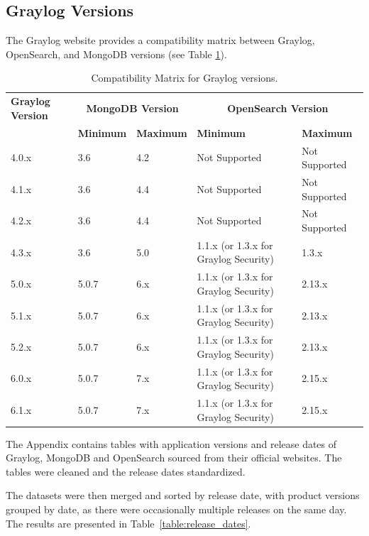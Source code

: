 \documentclass[../main.tex]{subfiles}
\begin{document}
\subsection{Graylog Versions}

The Graylog website provides a compatibility matrix between Graylog, OpenSearch, and MongoDB versions (see Table \ref{table:graylog_compatibility_matrix}). 

\begin{table}[h]
\centering
\begin{tabular}{|l|l|l|l|l|}
\hline
\textbf{Graylog Version} & \multicolumn{2}{c|}{\textbf{MongoDB Version}} & \multicolumn{2}{c|}{\textbf{OpenSearch Version}} \\ \cline{2-5}
 & \textbf{Minimum} & \textbf{Maximum} & \textbf{Minimum} & \textbf{Maximum} \\ \hline
4.0.x & 3.6 & 4.2 & Not Supported & Not Supported \\ \hline
4.1.x & 3.6 & 4.4 & Not Supported & Not Supported \\ \hline
4.2.x & 3.6 & 4.4 & Not Supported & Not Supported \\ \hline
4.3.x & 3.6 & 5.0 & 1.1.x (or 1.3.x for Graylog Security) & 1.3.x \\ \hline
5.0.x & 5.0.7 & 6.x & 1.1.x (or 1.3.x for Graylog Security) & 2.13.x \\ \hline
5.1.x & 5.0.7 & 6.x & 1.1.x (or 1.3.x for Graylog Security) & 2.13.x \\ \hline
5.2.x & 5.0.7 & 6.x & 1.1.x (or 1.3.x for Graylog Security) & 2.13.x \\ \hline
6.0.x & 5.0.7 & 7.x & 1.1.x (or 1.3.x for Graylog Security) & 2.15.x \\ \hline
6.1.x & 5.0.7 & 7.x & 1.1.x (or 1.3.x for Graylog Security) & 2.15.x \\ \hline
\end{tabular}
\caption{Compatibility Matrix for Graylog versions. \protect\footnotemark}
\label{table:graylog_compatibility_matrix}
\end{table}


The Appendix contains tables with application versions and release dates of Graylog, MongoDB and OpenSearch sourced from their official websites. The tables were cleaned and the release dates standardized.

The datasets were then merged and sorted by release date, with product versions grouped by date, as there were occasionally multiple releases on the same day. The results are presented in Table~\ref{table:release_dates}.
\end{document}
